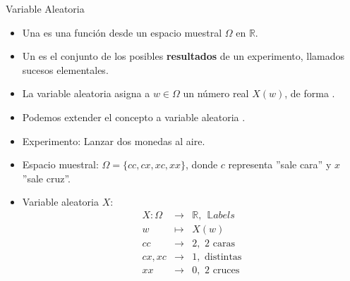 \documentclass[10pt, envcountsect, handout, aspectratio=1610, hyperref={hypertexnames=true}]{beamer}
\begin{document}
\begin{frame}{Variable Aleatoria}
\begin{definition}
\begin{itemize}
    \item Una  es una función desde un espacio muestral $\Omega$ en $\mathbb{R}$.
    \item Un  es el conjunto de los posibles \textbf{resultados} de un experimento, llamados sucesos elementales.
    \item La variable aleatoria asigna a $w \in \Omega$ un número real $X(w)$, de forma .
    \item Podemos extender el concepto a variable aleatoria .
\end{itemize}
\end{definition}

\small
\begin{example}
\begin{itemize}
    \item Experimento: Lanzar dos monedas al aire.
    \item Espacio muestral: $\Omega = \{cc, cx, xc, xx\}$, donde $c$ representa ''sale cara'' y $x$ ''sale cruz''.
    \item Variable aleatoria $X$:
\[
\begin{array}{rcl}
X: \Omega & \longrightarrow & \mathbb{R}, \ \ \mathbb{L}abels \\
w & \mapsto & X(w) \\  
cc & \rightarrow & 2, \mbox{\ \ 2 caras} \\
cx, xc & \rightarrow & 1, \mbox{\ \ distintas} \\
xx & \rightarrow & 0, \mbox{\ \ 2 cruces} 
\end{array}
\]
\end{itemize}

\end{example}

\end{frame}
\end{document}
